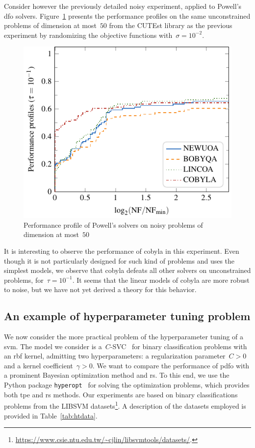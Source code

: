 \documentclass[
    smallextended,  %
    final,        %
]{svjour3}
\begin{document}
Consider however the previously detailed noisy experiment, applied to Powell's \gls{dfo} solvers.
Figure~\ref{fig:ppun-50} presents the performance profiles on the same unconstrained problems of dimension at most~$50$ from the CUTEst library as the previous experiment by randomizing the objective functions with~$\sigma = 10^{-2}$.

\begin{figure}[ht]
    \centering
    \includegraphics[width=.48\textwidth]{perf-noisy-pdfo-50-2.pdf}
    \caption{Performance profile of Powell's  solvers on noisy problems of dimension at most~$50$}
    \label{fig:ppun-50}
\end{figure}

It is interesting to observe the performance of \gls{cobyla} in this experiment.
Even though it is not particularly designed for such kind of problems and uses the simplest models, we observe that \gls{cobyla} defeats all other solvers on unconstrained problems, for~$\tau = 10^{-1}$.
It seems that the linear models of \gls{cobyla} are more robust to noise, but we have not yet derived a theory for this behavior.

\subsection{An example of hyperparameter tuning problem}

We now consider the more practical problem of the hyperparameter tuning of a \gls{svm}.
The model we consider is a~$C$-SVC~\cite{Chang_Lin_2011} for binary classification problems with an \gls{rbf} kernel, admitting two hyperparameters: a regularization parameter~$C > 0$ and a kernel coefficient~$\gamma > 0$.
We want to compare the performance of \gls{pdfo} with a prominent Bayesian optimization method and \gls{rs}.
To this end, we use the Python package \texttt{hyperopt}~\cite{Bergstra_Yamins_Cox_2013} for solving the optimization problems, which provides both \gls{tpe} and \gls{rs} methods.
Our experiments are based on binary classifications problems from the LIBSVM datasets\footnote{\url{https://www.csie.ntu.edu.tw/~cjlin/libsvmtools/datasets/}.}.
A description of the datasets employed is provided in Table~\ref{tab:htdata}.
\end{document}
